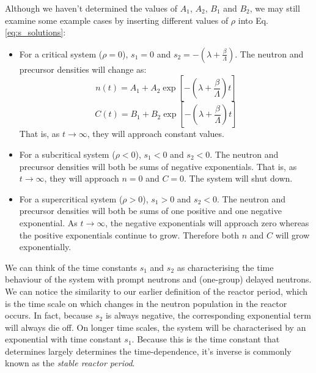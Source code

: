 Although we haven't determined the values of $A_1$, $A_2$, $B_1$ and $B_2$, we may still examine some example cases by inserting different values of $\rho$ into Eq. \ref{eq:s_solutions}:
\begin{itemize}
	\item For a critical system ($\rho = 0$), $s_1 = 0$ and $s_2 = -\left(\lambda + \frac{\beta}{\Lambda}\right)$. The neutron and precursor densities will change as:
		\[
			n(t) = A_1 + A_2 \exp \left[-\left(\lambda + \frac{\beta}{\Lambda}\right)t\right]
		\]
		\[
			C(t) = B_1 + B_2 \exp \left[-\left(\lambda + \frac{\beta}{\Lambda}\right)t\right]
		\]
		That is, as $t \rightarrow \infty$, they will approach constant values.
	\item For a subcritical system ($\rho < 0$), $s_1 < 0$ and $s_2 < 0$. The neutron and precursor densities will both be sums of negative exponentials. That is, as $t \rightarrow \infty$, they will approach $n = 0$ and $C = 0$. The system will shut down.
	\item For a supercritical system ($\rho > 0$), $s_1 > 0$ and $s_2 < 0$. The neutron and precursor densities will both be sums of one positive and one negative exponential. As $t \rightarrow \infty$, the negative exponentials will approach zero whereas the positive exponentials continue to grow. Therefore both $n$ and $C$ will grow exponentially.
\end{itemize}
We can think of the time constants $s_1$ and $s_2$ as characterising the time behaviour of the system with prompt neutrons and (one-group) delayed neutrons. We can notice the similarity to our earlier definition of the reactor period, which is the time scale on which changes in the neutron population in the reactor occurs. In fact, because $s_2$ is always negative, the corresponding exponential term will always die off. On longer time scales, the system will be characterised by an exponential with time constant $s_1$. Because this is the time constant that determines largely determines the time-dependence, it's inverse is commonly known as the \emph{stable reactor period}.

